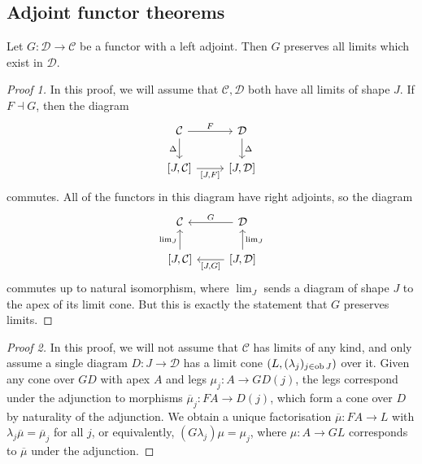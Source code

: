 \subsection{Adjoint functor theorems}
\begin{lemma}
    Let \( G : \mathcal D \to \mathcal C \) be a functor with a left adjoint.
    Then \( G \) preserves all limits which exist in \( \mathcal D \).
\end{lemma}
\begin{proof}[Proof 1]
    In this proof, we will assume that \( \mathcal C, \mathcal D \) both have all limits of shape \( J \).
    If \( F \dashv G \), then the diagram
\[\begin{tikzcd}
	{\mathcal C} & {\mathcal D} \\
	{[J, \mathcal C]} & {[J, \mathcal D]}
	\arrow["F", from=1-1, to=1-2]
	\arrow["\Delta"', from=1-1, to=2-1]
	\arrow["\Delta", from=1-2, to=2-2]
	\arrow["{[J,F]}"', from=2-1, to=2-2]
\end{tikzcd}\]
    commutes.
    All of the functors in this diagram have right adjoints, so the diagram
\[\begin{tikzcd}
	{\mathcal C} & {\mathcal D} \\
	{[J, \mathcal C]} & {[J, \mathcal D]}
	\arrow["{\lim_J}"', from=2-2, to=1-2]
	\arrow["G"', from=1-2, to=1-1]
	\arrow["{[J, G]}", from=2-2, to=2-1]
	\arrow["{\lim_J}", from=2-1, to=1-1]
\end{tikzcd}\]
    commutes up to natural isomorphism, where \( \lim_J \) sends a diagram of shape \( J \) to the apex of its limit cone.
    But this is exactly the statement that \( G \) preserves limits.
\end{proof}
\begin{proof}[Proof 2]
    In this proof, we will not assume that \( \mathcal C \) has limits of any kind, and only assume a single diagram \( D : J \to \mathcal D \) has a limit cone \( (L, (\lambda_j)_{j \in \operatorname{ob} J}) \) over it.
    Given any cone over \( GD \) with apex \( A \) and legs \( \mu_j : A \to GD(j) \), the legs correspond under the adjunction to morphisms \( \overline \mu_j : FA \to D(j) \), which form a cone over \( D \) by naturality of the adjunction.
    We obtain a unique factorisation \( \overline \mu : FA \to L \) with \( \lambda_j \overline \mu = \overline \mu_j \) for all \( j \), or equivalently, \( (G\lambda_j)\mu = \mu_j \), where \( \mu : A \to GL \) corresponds to \( \overline \mu \) under the adjunction.
\end{proof}
